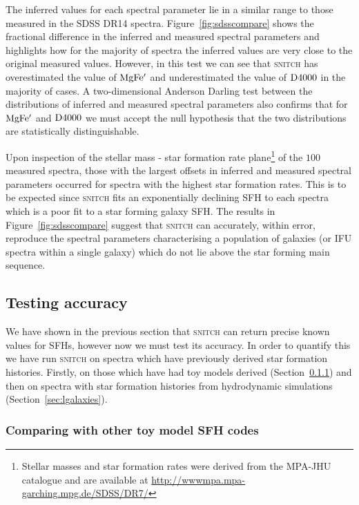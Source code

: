 \documentclass[useAMS,usenatbib]{mn2e}
\begin{document}
The inferred values for each spectral parameter lie in a similar range to those measured in the SDSS DR14 spectra. Figure~\ref{fig:sdsscompare} shows the fractional difference in the inferred and measured spectral parameters and highlights how for the majority of spectra the inferred values are very close to the original measured values. However, in this test we can see that \textsc{snitch} has overestimated the value of $\rm{MgFe'}$ and underestimated the value of $\rm{D4000}$ in the majority of cases. A two-dimensional Anderson Darling test \citep{anderson52} between the distributions of inferred and measured spectral parameters also confirms that for $\rm{MgFe'}$ and $\rm{D4000}$ we must accept the null hypothesis that the two distributions are statistically distinguishable. 

Upon inspection of the stellar mass - star formation rate plane\footnote{Stellar masses and star formation rates were derived from the MPA-JHU catalogue \protect\citep[][which are corrected for aperture bias]{brinchmann04} and are available at {\url{http://wwwmpa.mpa-garching.mpg.de/SDSS/DR7/}}} of the $100$ measured spectra, those with the largest offsets in inferred and measured spectral parameters occurred for spectra with the highest star formation rates. This is to be expected since \textsc{snitch} fits an exponentially declining SFH to each spectra which is a poor fit to a star forming galaxy SFH. The results in Figure~\ref{fig:sdsscompare} suggest that \textsc{snitch} can accurately, within error, reproduce the spectral parameters characterising a population of galaxies (or IFU spectra within a single galaxy) which do not lie above the star forming main sequence. 

\subsection{Testing accuracy}\label{sec:accuracytest}

We have shown in the previous section that \textsc{snitch} can return precise known values for SFHs, however now we must test its accuracy. In order to quantify this we have run \textsc{snitch} on spectra which have previously derived star formation histories. Firstly, on those which have had toy models derived (Section~\ref{secsec:compare}) and then on spectra with star formation histories from hydrodynamic simulations (Section~\ref{sec:lgalaxies}).

\subsubsection{Comparing with other toy model SFH codes}\label{secsec:compare}
\end{document}
